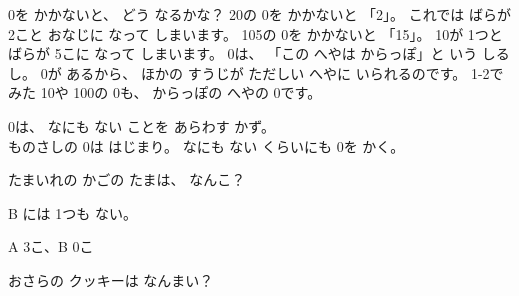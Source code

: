 \noindent 0を かかないと、 どう なるかな？ 20の 0を かかないと 「2」。 これでは ばらが 2こと おなじに なって しまいます。 105の 0を かかないと 「15」。 10が 1つと ばらが 5こに なって しまいます。 0は、 「この へやは からっぽ」と いう しるし。 0が あるから、 ほかの すうじが ただしい へやに いられるのです。 1-2で みた 10や 100の 0も、 からっぽの へやの 0です。

\begin{taisetsu}
0は、 なにも ない ことを あらわす かず。\\
ものさしの 0は はじまり。 なにも ない くらいにも 0を かく。
\end{taisetsu}

\begin{reidai}
たまいれの かごの たまは、 なんこ？\par\vspace{3pt}
\noindent\begin{minipage}[c]{0.56\linewidth}
\kangaekata B には 1つも ない。

\kotae A 3こ、\enspace B 0こ
\end{minipage}\hfill
\begin{minipage}[c]{0.42\linewidth}\centering
{}
\end{minipage}
\end{reidai}

\begin{jibun}
おさらの クッキーは なんまい？
\begin{bkfigure}
\end{bkfigure}
\end{jibun}

